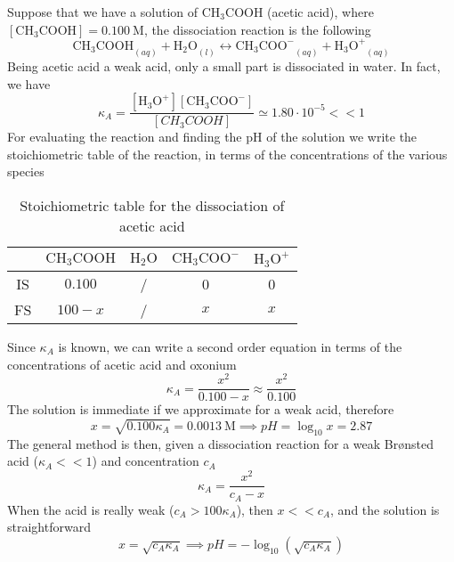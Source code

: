 \documentclass[../qm.tex]{subfiles}
\begin{document}
\begin{mtd}
	Suppose that we have a solution of $\mathrm{CH_3COOH}$ (acetic acid), where $\left[ \mathrm{CH_3COOH} \right]=0.100\ \mathrm{M}$, the dissociation reaction is the following
	\begin{equation}
		\mathrm{CH_3COOH}_{(aq)}+\mathrm{H_2O}_{(l)}\longleftrightarrow\mathrm{CH_3COO^-}_{(aq)}+\mathrm{H_3O^+}_{(aq)}
		\label{eq:ch3cooh.chem}
	\end{equation}
	Being acetic acid a weak acid, only a small part is dissociated in water. In fact, we have
	\begin{equation*}
		\kappa_A=\frac{\left[ \mathrm{H_3O^+} \right]\left[ \mathrm{CH_3COO^-} \right]}{\left[ CH_3COOH \right]}\simeq1.80\cdot10^{-5}<<1
	\end{equation*}
	For evaluating the reaction and finding the pH of the solution we write the stoichiometric table of the reaction, in terms of the concentrations of the various species
	\begin{table}[H]
		\centering
		\begin{tabular}{c|c|c|c|c|}
			&$\mathrm{CH_3COOH}$&$\mathrm{H_2O}$&$\mathrm{CH_3COO^-}$&$\mathrm{H_3O^+}$\\\hline
			IS&$0.100$&/&0&0\\\hline
			FS&$100-x$&/&$x$&$x$
		\end{tabular}
		\caption{Stoichiometric table for the dissociation of acetic acid}
		\label{tab:ch3cooh.chem}
	\end{table}
	Since $\kappa_A$ is known, we can write a second order equation in terms of the concentrations of acetic acid and oxonium
	\begin{equation*}
		\kappa_A=\frac{x^2}{0.100-x}\approx\frac{x^2}{0.100}
	\end{equation*}
	The solution is immediate if we approximate for a weak acid, therefore
	\begin{equation*}
		x=\sqrt{0.100\kappa_A}=0.0013\ \mathrm{M}\implies pH=\log_{10}x=2.87
	\end{equation*}
	The general method is then, given a dissociation reaction for a weak Brønsted acid ($\kappa_A<<1$) and concentration $c_A$
	\begin{equation}
		\kappa_A=\frac{x^2}{c_A-x}
		\label{eq.acidka.chem}
	\end{equation}
	When the acid is really weak ($c_A>100\kappa_A$), then $x<<c_A$, and the solution is straightforward
	\begin{equation*}
		x=\sqrt{c_A\kappa_A}\implies pH=-\log_{10}\left( \sqrt{c_A\kappa_A} \right)

\end{equation*}
\end{mtd}
\end{document}
